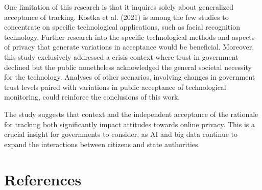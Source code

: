 \documentclass[
  letterpaper,
  DIV=11,
  numbers=noendperiod]{scrartcl}
\begin{document}
One limitation of this research is that it inquires solely about
generalized acceptance of tracking. Kostka et al. (2021) is among the
few studies to concentrate on specific technological applications, such
as facial recognition technology. Further research into the specific
technological methods and aspects of privacy that generate variations in
acceptance would be beneficial. Moreover, this study exclusively
addressed a crisis context where trust in government declined but the
public nonetheless acknowledged the general societal necessity for the
technology. Analyses of other scenarios, involving changes in government
trust levels paired with variations in public acceptance of
technological monitoring, could reinforce the conclusions of this work.

The study suggests that context and the independent acceptance of the
rationale for tracking both significantly impact attitudes towards
online privacy. This is a crucial insight for governments to consider,
as AI and big data continue to expand the interactions between citizens
and state authorities.

\newpage{}

\section{References}\label{references}
\end{document}

